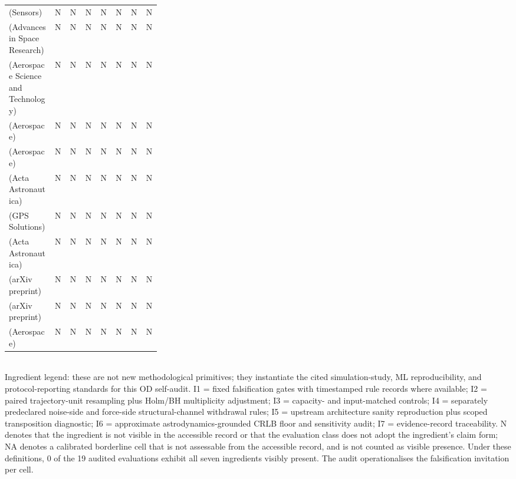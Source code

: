 \begin{table}[t]
\begin{tabular}{p{0.30\linewidth}ccccccc}
    \cite{zhu2025bayesian} (Sensors) & N & N & N & N & N & N & N \\
    \cite{gao2025heavytailed} (Advances in Space Research) & N & N & N & N & N & N & N \\
    \cite{sztamfater2026sequential} (Aerospace Science and Technology) & N & N & N & N & N & N & N \\
    \cite{xu2026arckf} (Aerospace) & N & N & N & N & N & N & N \\
    \cite{li2026delay} (Aerospace) & N & N & N & N & N & N & N \\
    \cite{zhang2026hnn} (Acta Astronautica) & N & N & N & N & N & N & N \\
    \cite{chen2026orbitrecovery} (GPS Solutions) & N & N & N & N & N & N & N \\
    \cite{lowe2026drag} (Acta Astronautica) & N & N & N & N & N & N & N \\
    \cite{pinheiro2024flexkalmannet} (arXiv preprint) & N & N & N & N & N & N & N \\
    \cite{varey2024physics} (arXiv preprint) & N & N & N & N & N & N & N \\
    \cite{zhu2026multiscale} (Aerospace) & N & N & N & N & N & N & N \\
    \bottomrule
  \end{tabular}
  \\[2pt] {\footnotesize Ingredient legend: these are not new methodological primitives; they instantiate the cited simulation-study, ML reproducibility, and protocol-reporting standards for this OD self-audit. I1 = fixed falsification gates with timestamped rule records where available; I2 = paired trajectory-unit resampling plus Holm/BH multiplicity adjustment; I3 = capacity- and input-matched controls; I4 = separately predeclared noise-side and force-side structural-channel withdrawal rules; I5 = upstream architecture sanity reproduction plus scoped transposition diagnostic; I6 = approximate astrodynamics-grounded CRLB floor and sensitivity audit; I7 = evidence-record traceability. N denotes that the ingredient is not visible in the accessible record or that the evaluation class does not adopt the ingredient's claim form; NA denotes a calibrated borderline cell that is not assessable from the accessible record, and is not counted as visible presence. Under these definitions, 0 of the 19 audited evaluations exhibit all seven ingredients visibly present. The audit operationalises the falsification invitation per cell.}
\end{table}

